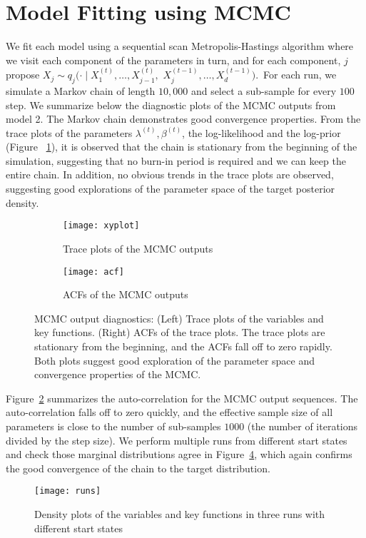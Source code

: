 \section{Model Fitting using MCMC}
We fit each model using a sequential scan Metropolis-Hastings algorithm where we visit each component of the parameters in turn, and for each component, $j$ propose $X_{j} \sim q_{j}(\cdot \mid X_{1}^{(t)}, \ldots, X_{j-1}^{(t)},$ $X_{j}^{(t-1)}, \ldots, X_{d}^{(t-1)})$.\footnotemark~For each run, we simulate a Markov chain of length $10,000$ and select a sub-sample for every $100$ step. We summarize below the diagnostic plots of the MCMC outputs from model 2. The Markov chain demonstrates good convergence properties. From the trace plots of the parameters $\lambda^{(t)}, \beta^{(t)}$, the log-likelihood and the log-prior (Figure~ \ref{fig:4a}), it is observed that the chain is stationary from the beginning of the simulation, suggesting that no burn-in period is required and we can keep the entire chain. In addition, no obvious trends in the trace plots are observed, suggesting good explorations of the parameter space of the target posterior density. 

\begin{figure}[ht!]
\centering
\begin{subfigure}[b]{0.45\textwidth} \centering
\texttt{[image: xyplot]}
\caption{Trace plots of the MCMC outputs}
\label{fig:4a}
\end{subfigure}
\begin{subfigure}[b]{0.45\textwidth} \centering
\texttt{[image: acf]}
\caption{ACFs of the MCMC outputs}
\label{fig:4b}
\end{subfigure} \hspace{1em}
\caption{MCMC output diagnostics: (Left) Trace plots of the variables and key functions. (Right) ACFs of the trace plots.
The trace plots are stationary from the beginning, and the ACFs fall off to zero rapidly. Both plots suggest good exploration of the parameter space and convergence properties of the MCMC.} \label{fig:4}
\end{figure}

Figure~\ref{fig:4b} summarizes the auto-correlation for the MCMC output sequences. The auto-correlation falls off to zero quickly, and the effective sample size of all parameters is close to the number of sub-samples $1000$ (the number of iterations divided by the step size). We perform multiple runs from different start states and check those marginal distributions agree in Figure~\ref{fig:5}, which again confirms the good convergence of the chain to the target distribution.
\begin{figure}[ht!]
\centering
\texttt{[image: runs]}
\caption{Density plots of the variables and key functions in three runs with different start states}
\label{fig:5}
\end{figure}
